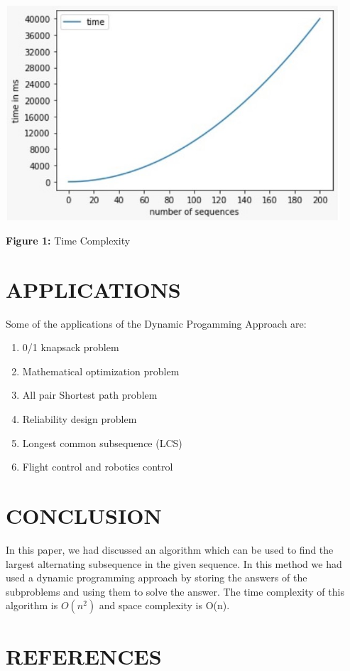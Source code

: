 \documentclass[10pt]{article}
\begin{document}
\begin{multicols*}{2}
\includegraphics[width=\columnwidth, height=8cm]{time.jpg}\begin{center}\textbf{Figure 1:} Time Complexity\end{center}

\section*{APPLICATIONS}
Some of the applications of the Dynamic Progamming Approach are:

\begin{enumerate}
\item 0/1 knapsack problem
\item Mathematical optimization problem
\item All pair Shortest path problem
\item Reliability design problem
\item Longest common subsequence (LCS)
\item Flight control and robotics control
\end{enumerate}

\section*{CONCLUSION}

In this paper, we had discussed an algorithm which can be used to find the largest alternating subsequence in the given sequence. In this method we had used a dynamic programming approach by storing the answers of the subproblems and using them to solve the answer. The time complexity of this algorithm is $ O(n^2) $ and space complexity is O(n).

\section*{REFERENCES}


\end{multicols*}
\end{document}
